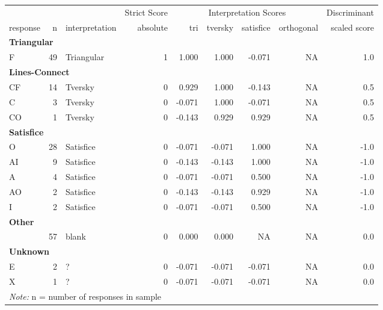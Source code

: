 \documentclass[
  letterpaper,
  DIV=11,
  numbers=noendperiod]{scrreprt}
\begin{document}
\begin{tabular}[t]{l|r|l|r|r|r|r|r|r}
\hline
\multicolumn{3}{c|}{ } & \multicolumn{1}{c|}{Strict Score} & \multicolumn{4}{c|}{Interpretation Scores} & \multicolumn{1}{c}{Discriminant} \\
\cline{4-4} \cline{5-8} \cline{9-9}
response & n & interpretation & absolute & tri & tversky & satisfice & orthogonal & scaled score\\
\hline
\multicolumn{9}{l}{\textbf{Triangular}}\\
\hline
\hspace{1em}F & 49 & Triangular & 1 & 1.000 & 1.000 & -0.071 & NA & 1.0\\
\hline
\multicolumn{9}{l}{\textbf{Lines-Connect}}\\
\hline
\hspace{1em}CF & 14 & Tversky & 0 & 0.929 & 1.000 & -0.143 & NA & 0.5\\
\hline
\hspace{1em}C & 3 & Tversky & 0 & -0.071 & 1.000 & -0.071 & NA & 0.5\\
\hline
\hspace{1em}CO & 1 & Tversky & 0 & -0.143 & 0.929 & 0.929 & NA & 0.5\\
\hline
\multicolumn{9}{l}{\textbf{Satisfice}}\\
\hline
\hspace{1em}O & 28 & Satisfice & 0 & -0.071 & -0.071 & 1.000 & NA & -1.0\\
\hline
\hspace{1em}AI & 9 & Satisfice & 0 & -0.143 & -0.143 & 1.000 & NA & -1.0\\
\hline
\hspace{1em}A & 4 & Satisfice & 0 & -0.071 & -0.071 & 0.500 & NA & -1.0\\
\hline
\hspace{1em}AO & 2 & Satisfice & 0 & -0.143 & -0.143 & 0.929 & NA & -1.0\\
\hline
\hspace{1em}I & 2 & Satisfice & 0 & -0.071 & -0.071 & 0.500 & NA & -1.0\\
\hline
\multicolumn{9}{l}{\textbf{Other}}\\
\hline
\hspace{1em} & 57 & blank & 0 & 0.000 & 0.000 & NA & NA & 0.0\\
\hline
\multicolumn{9}{l}{\textbf{Unknown}}\\
\hline
\hspace{1em}E & 2 & ? & 0 & -0.071 & -0.071 & -0.071 & NA & 0.0\\
\hline
\hspace{1em}X & 1 & ? & 0 & -0.071 & -0.071 & -0.071 & NA & 0.0\\
\hline
\multicolumn{9}{l}{\rule{0pt}{1em}\textit{Note: } n = number of responses in sample}\\
\end{tabular}
\end{document}
